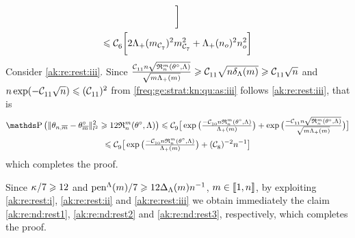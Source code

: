 \begin{pro}
\begin{multline*}
\bigg]\\
\leq\cst{6}\bigg[2\miSv[\Di_{\cst{7}}]^2\Di_{\cst{7}}^2+\miSv[\ssY_{o}]^2\ssY_{o}^2\bigg]
\end{multline*}
Consider \ref{ak:re:rest:iii}. Since
$\tfrac{\cst{11}\ssY\sqrt{\daRa{\Di}{(\xdf,\Lambda)}}}{\sqrt{\Di\miSv}}\geq\cst{11}\sqrt{\ssY\cmiSv}\geq\cst{11}\sqrt{\ssY}$
and $\ssY\exp(-\cst{11}\sqrt{\ssY})\leq(\cst{11})^2$ 
from  \ref{freq:ge:strat:kn:qu:as:iii} follows \ref{ak:re:rest:iii}, that is 
\begin{multline*}
 \P\big(\Vnormlp{\txdfPr-\xdfPr}^2 \geq 12\daRa{\Di}{(\xdf,\Lambda)}\big)\leq 
    \cst{9} \big[\exp\big(\tfrac{-\cst{10}\ssY\daRa{\Di}{(\xdf,\Lambda)}}{\miSv}\big)
    +\exp\big(\tfrac{-\cst{11}\ssY\sqrt{\daRa{\Di}{(\xdf,\Lambda)}}}{\sqrt{\Di\miSv}}\big)\big]\\\leq \cst{9} \big[\exp\big(\tfrac{-\cst{10}\ssY\daRa{\Di}{(\xdf,\Lambda)}}{\miSv}\big)
    +(\cst{8})^{-2}\ssY^{-1}\big] 
\end{multline*}
which  completes the proof.
\proEnd
\end{pro}

\begin{pro}
  Since $\cpen/7\geq 12$ and $\penSv/7\geq12\DipenSv\ssY^{-1}$,
  $\Di\in\nset{1,n}$, by exploiting 
  \ref{ak:re:rest:i}, \ref{ak:re:rest:ii} and \ref{ak:re:rest:iii} we
  obtain immediately the claim \ref{ak:re:nd:rest1},
  \ref{ak:re:nd:rest2} and \ref{ak:re:nd:rest3}, respectively, which  completes the proof.
\proEnd\end{pro}

